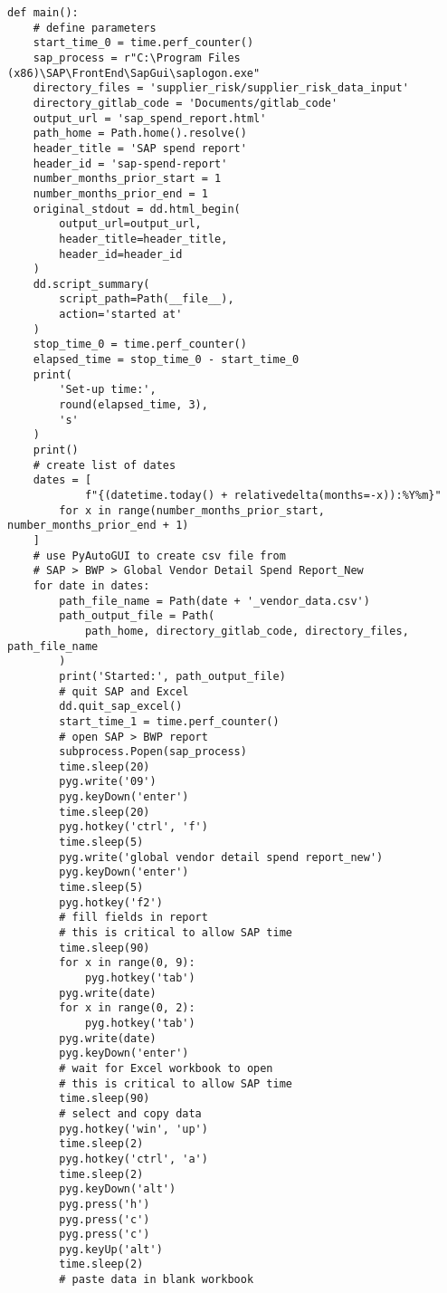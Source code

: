 \documentclass[10pt, letterpaper, twoside]{article}
\begin{document}
\begin{footnotesize}
\begin{verbatim}
def main():
    # define parameters
    start_time_0 = time.perf_counter()
    sap_process = r"C:\Program Files (x86)\SAP\FrontEnd\SapGui\saplogon.exe"
    directory_files = 'supplier_risk/supplier_risk_data_input'
    directory_gitlab_code = 'Documents/gitlab_code'
    output_url = 'sap_spend_report.html'
    path_home = Path.home().resolve()
    header_title = 'SAP spend report'
    header_id = 'sap-spend-report'
    number_months_prior_start = 1
    number_months_prior_end = 1
    original_stdout = dd.html_begin(
        output_url=output_url,
        header_title=header_title,
        header_id=header_id
    )
    dd.script_summary(
        script_path=Path(__file__),
        action='started at'
    )
    stop_time_0 = time.perf_counter()
    elapsed_time = stop_time_0 - start_time_0
    print(
        'Set-up time:',
        round(elapsed_time, 3),
        's'
    )
    print()
    # create list of dates
    dates = [
            f"{(datetime.today() + relativedelta(months=-x)):%Y%m}"
        for x in range(number_months_prior_start, number_months_prior_end + 1)
    ]
    # use PyAutoGUI to create csv file from
    # SAP > BWP > Global Vendor Detail Spend Report_New
    for date in dates:
        path_file_name = Path(date + '_vendor_data.csv')
        path_output_file = Path(
            path_home, directory_gitlab_code, directory_files, path_file_name
        )
        print('Started:', path_output_file)
        # quit SAP and Excel
        dd.quit_sap_excel()
        start_time_1 = time.perf_counter()
        # open SAP > BWP report
        subprocess.Popen(sap_process)
        time.sleep(20)
        pyg.write('09')
        pyg.keyDown('enter')
        time.sleep(20)
        pyg.hotkey('ctrl', 'f')
        time.sleep(5)
        pyg.write('global vendor detail spend report_new')
        pyg.keyDown('enter')
        time.sleep(5)
        pyg.hotkey('f2')
        # fill fields in report
        # this is critical to allow SAP time
        time.sleep(90)
        for x in range(0, 9):
            pyg.hotkey('tab')
        pyg.write(date)
        for x in range(0, 2):
            pyg.hotkey('tab')
        pyg.write(date)
        pyg.keyDown('enter')
        # wait for Excel workbook to open
        # this is critical to allow SAP time
        time.sleep(90)
        # select and copy data
        pyg.hotkey('win', 'up')
        time.sleep(2)
        pyg.hotkey('ctrl', 'a')
        time.sleep(2)
        pyg.keyDown('alt')
        pyg.press('h')
        pyg.press('c')
        pyg.press('c')
        pyg.keyUp('alt')
        time.sleep(2)
        # paste data in blank workbook

\end{verbatim}
\end{footnotesize}
\end{document}
